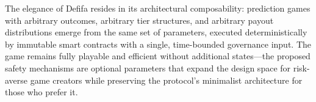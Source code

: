 \documentclass[11pt,a4paper]{article}
\begin{document}
The elegance of Defifa resides in its architectural composability: prediction games with arbitrary outcomes, arbitrary tier structures, and arbitrary payout distributions emerge from the same set of parameters, executed deterministically by immutable smart contracts with a single, time-bounded governance input. The game remains fully playable and efficient without additional states---the proposed safety mechanisms are optional parameters that expand the design space for risk-averse game creators while preserving the protocol's minimalist architecture for those who prefer it.
\end{document}
